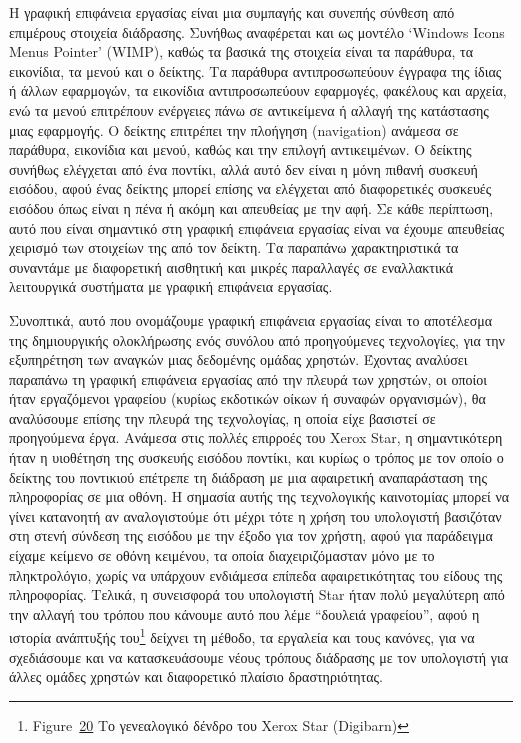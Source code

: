 \documentclass[
]{article}
\begin{document}
Η γραφική επιφάνεια εργασίας είναι μια συμπαγής και συνεπής σύνθεση από
επιμέρους στοιχεία διάδρασης. Συνήθως αναφέρεται και ως μοντέλο `Windows
Icons Menus Pointer' (WIMP), καθώς τα βασικά της στοιχεία είναι τα
παράθυρα, τα εικονίδια, τα μενού και ο δείκτης. Τα παράθυρα
αντιπροσωπεύουν έγγραφα της ίδιας ή άλλων εφαρμογών, τα εικονίδια
αντιπροσωπεύουν εφαρμογές, φακέλους και αρχεία, ενώ τα μενού επιτρέπουν
ενέργειες πάνω σε αντικείμενα ή αλλαγή της κατάστασης μιας εφαρμογής. Ο
δείκτης επιτρέπει την πλοήγηση (navigation) ανάμεσα σε παράθυρα,
εικονίδια και μενού, καθώς και την επιλογή αντικειμένων. Ο δείκτης
συνήθως ελέγχεται από ένα ποντίκι, αλλά αυτό δεν είναι η μόνη πιθανή
συσκευή εισόδου, αφού ένας δείκτης μπορεί επίσης να ελέγχεται από
διαφορετικές συσκευές εισόδου όπως είναι η πένα ή ακόμη και απευθείας με
την αφή. Σε κάθε περίπτωση, αυτό που είναι σημαντικό στη γραφική
επιφάνεια εργασίας είναι να έχουμε απευθείας χειρισμό των στοιχείων της
από τον δείκτη. Τα παραπάνω χαρακτηριστικά τα συναντάμε με διαφορετική
αισθητική και μικρές παραλλαγές σε εναλλακτικά λειτουργικά συστήματα με
γραφική επιφάνεια εργασίας.

Συνοπτικά, αυτό που ονομάζουμε γραφική επιφάνεια εργασίας είναι το
αποτέλεσμα της δημιουργικής ολοκλήρωσης ενός συνόλου από προηγούμενες
τεχνολογίες, για την εξυπηρέτηση των αναγκών μιας δεδομένης ομάδας
χρηστών. Έχοντας αναλύσει παραπάνω τη γραφική επιφάνεια εργασίας από την
πλευρά των χρηστών, οι οποίοι ήταν εργαζόμενοι γραφείου (κυρίως
εκδοτικών οίκων ή συναφών οργανισμών), θα αναλύσουμε επίσης την πλευρά
της τεχνολογίας, η οποία είχε βασιστεί σε προηγούμενα έργα. Ανάμεσα στις
πολλές επιρροές του Xerox Star, η σημαντικότερη ήταν η υιοθέτηση της
συσκευής εισόδου ποντίκι, και κυρίως ο τρόπος με τον οποίο ο δείκτης του
ποντικιού επέτρεπε τη διάδραση με μια αφαιρετική αναπαράσταση της
πληροφορίας σε μια οθόνη. Η σημασία αυτής της τεχνολογικής καινοτομίας
μπορεί να γίνει κατανοητή αν αναλογιστούμε ότι μέχρι τότε η χρήση του
υπολογιστή βασιζόταν στη στενή σύνδεση της εισόδου με την έξοδο για τον
χρήστη, αφού για παράδειγμα είχαμε κείμενο σε οθόνη κειμένου, τα οποία
διαχειριζόμασταν μόνο με το πληκτρολόγιο, χωρίς να υπάρχουν ενδιάμεσα
επίπεδα αφαιρετικότητας του είδους της πληροφορίας. Τελικά, η συνεισφορά
του υπολογιστή Star ήταν πολύ μεγαλύτερη από την αλλαγή του τρόπου που
κάνουμε αυτό που λέμε ``δουλειά γραφείου'', αφού η ιστορία ανάπτυξής
του\footnote{Figure~\protect\hyperlink{fig:xerox-star-genealogy}{20} Το
  γενεαλογικό δένδρο του Xerox Star (Digibarn)} δείχνει τη μέθοδο, τα
εργαλεία και τους κανόνες, για να σχεδιάσουμε και να κατασκευάσουμε
νέους τρόπους διάδρασης με τον υπολογιστή για άλλες ομάδες χρηστών και
διαφορετικό πλαίσιο δραστηριότητας.
\end{document}
